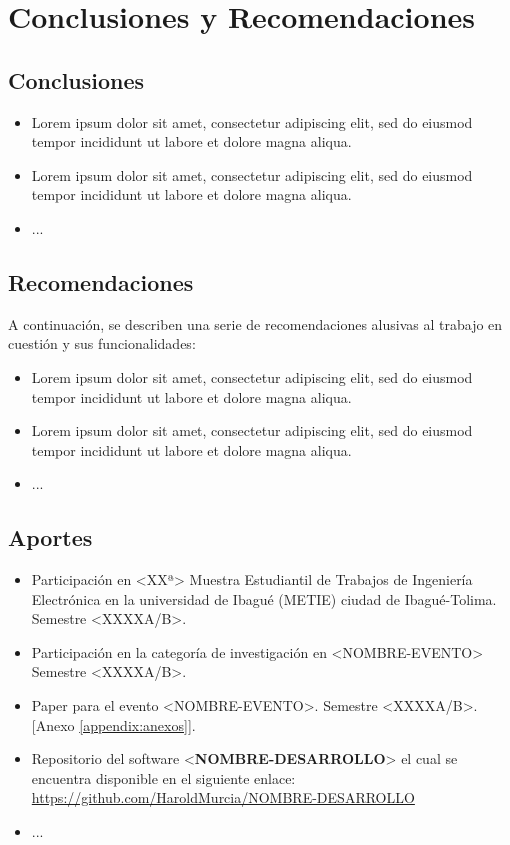 \chapter{Conclusiones y Recomendaciones}

\section{Conclusiones}
\begin{itemize}
\item Lorem ipsum dolor sit amet, consectetur adipiscing elit, sed do eiusmod tempor incididunt ut labore et dolore magna aliqua.
\item Lorem ipsum dolor sit amet, consectetur adipiscing elit, sed do eiusmod tempor incididunt ut labore et dolore magna aliqua.
\item ...
\end{itemize} 

\section{Recomendaciones}
A continuación, se describen una serie de recomendaciones alusivas al trabajo en cuestión y sus funcionalidades:
\begin{itemize}
\item Lorem ipsum dolor sit amet, consectetur adipiscing elit, sed do eiusmod tempor incididunt ut labore et dolore magna aliqua.
\item Lorem ipsum dolor sit amet, consectetur adipiscing elit, sed do eiusmod tempor incididunt ut labore et dolore magna aliqua.
\item ...
\end{itemize} 

\section{Aportes}
\begin{itemize}
\item Participación en <XXª> Muestra Estudiantil de Trabajos de Ingeniería Electrónica en la universidad de Ibagué (METIE) ciudad de Ibagué-Tolima. Semestre <XXXXA/B>. 
\item Participación en la categoría de investigación en <NOMBRE-EVENTO> Semestre <XXXXA/B>. 
\item Paper para el evento <NOMBRE-EVENTO>. Semestre <XXXXA/B>. [Anexo \ref{appendix:anexos}]. 
\item Repositorio del software <\textbf{NOMBRE-DESARROLLO}> el cual se encuentra disponible en el siguiente enlace: \url{https://github.com/HaroldMurcia/NOMBRE-DESARROLLO}
\item ...
\end{itemize} 